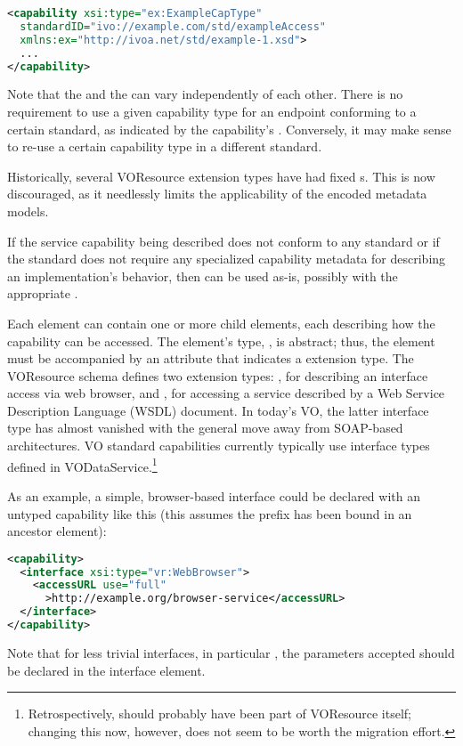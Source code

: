 \documentclass[11pt,a4paper]{ivoa}
\begin{document}
\begin{lstlisting}[language=XML]
<capability xsi:type="ex:ExampleCapType"
  standardID="ivo://example.com/std/exampleAccess"
  xmlns:ex="http://ivoa.net/std/example-1.xsd">
  ...
</capability>
\end{lstlisting}

Note that the  and the  can vary
independently of each other.  There is no requirement to use a given
capability type for an endpoint conforming to a certain standard, as
indicated by the capability's . Conversely,
it may make sense to re-use a certain capability type in a different
standard.

Historically, several VOResource extension types have had
fixed s.  This is now discouraged, as it needlessly
limits the applicability of the encoded metadata models.

If the service capability being described does not conform to any
standard or if the standard does not require any specialized
capability metadata for describing an implementation's behavior, then
 can be used as-is, possibly with the appropriate
.


Each  element can contain one or more child
 elements, each describing how the capability
can be accessed.  The  element's type,
, is abstract; thus, the
 element must be accompanied by an
 attribute that indicates a
 extension type.  The VOResource schema
defines two  extension types:
, for describing an interface access via web
browser, and , for accessing a service
described by a Web Service Description Language (WSDL) document.  In
today's VO, the latter interface type has almost vanished with the
general move away from SOAP-based architectures.  VO standard
capabilities currently typically use interface types defined in
VODataService.\footnote{Retrospectively,  should probably
have been part of VOResource itself; changing this now, however, does
not seem to be worth the migration effort.}

As an example, a simple, browser-based interface could be declared with
an untyped capability like this (this assumes the  prefix has
been bound in an ancestor element):
\begin{lstlisting}[language=XML]
<capability>
  <interface xsi:type="vr:WebBrowser">
    <accessURL use="full"
      >http://example.org/browser-service</accessURL>
  </interface>
</capability>
\end{lstlisting}
Note that for less trivial interfaces, in particular
, the parameters accepted should be declared in the
interface element.
\end{document}
